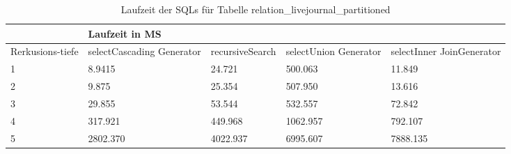 \begin{table}[H]
	\centering
	\begin{tabular}{l|l|l|l|l|l|}
		\cline{2-6}
		& \multicolumn{5}{|l|}{Laufzeit in MS}                                                                                                                                                  \\ \hline
		\multicolumn{1}{|l|}{\multirow{2}{2cm}{Rerkusions-tiefe}} & \multicolumn{2}{|l|}{\multirow{2}{3cm}{selectCascading Generator}} & \multirow{2}{2.8cm}{recursiveSearch} & \multirow{2}{2.5cm}{selectUnion Generator} & \multirow{2}{2.5cm}{selectInner JoinGenerator} \\
		\multicolumn{1}{|l|}{}
		& \multicolumn{2}{|l|}{}                                           &                                  &                                     &                                           \\ \hline
		
		\multicolumn{1}{|l|}{1}                                 & \multicolumn{2}{l|}{8.9415}                                      & 24.721                                                & 500.063                                                   & 11.849                                                          \\ \hline
		\multicolumn{1}{|l|}{2}                                 & \multicolumn{2}{l|}{9.875}                                       & 25.354                                                & 507.950                                                   & 13.616                                                          \\ \hline
		\multicolumn{1}{|l|}{3}                                 & \multicolumn{2}{l|}{29.855}                                      & 53.544                                                & 532.557                                                   & 72.842                                                          \\ \hline
		\multicolumn{1}{|l|}{4}                                 & \multicolumn{2}{l|}{317.921}                                     & 449.968                                               & 1062.957                                                  & 792.107                                                         \\ \hline
		\multicolumn{1}{|l|}{5}                                 & \multicolumn{2}{l|}{2802.370}                                    & 4022.937                                              & 6995.607                                                  & 7888.135                                                        \\ \hline
		
		
		
	\end{tabular}
	\caption{Laufzeit der SQLs für Tabelle relation\_livejournal\_partitioned}
\end{table}
